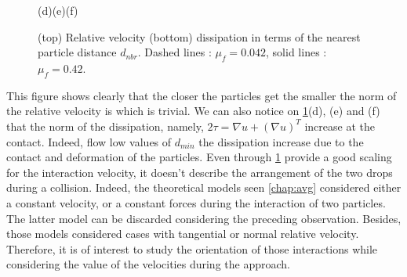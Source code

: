 \begin{figure}[h!]
        \hspace{3cm}(d)\hfill(e)\hfill(f)\hspace{2.5cm}
        
        \caption{(top) Relative velocity (bottom) dissipation in terms of the nearest particle distance $d_{nbr}$. Dashed lines : $\mu_f = 0.042$, solid lines : $\mu_f = 0.42$.} 
        \label{fig:Pvrel}
    \end{figure} 
This figure shows clearly that the closer the particles get the smaller the norm of the relative velocity is which is trivial.
We can also notice on \ref{fig:Pvrel}(d), (e) and (f) that the norm of the dissipation, namely, $2\tau = \nabla u + (\nabla u)^T$ increase at the contact. 
Indeed, flow low values of $d_{min}$ the dissipation increase due to the contact and deformation of the particles.   
Even through \ref{fig:Pvrel} provide a good scaling for the interaction velocity, it doesn't describe the arrangement of the two drops during a collision. 
Indeed, the theoretical models seen \ref{chap:avg} considered either a constant velocity, or a constant forces during the interaction of two particles.
The latter model can be discarded considering the preceding observation.
Besides, those models considered cases with tangential or  normal relative velocity. 
Therefore, it is of interest to study the orientation of those interactions while considering the value of the velocities during the approach.

